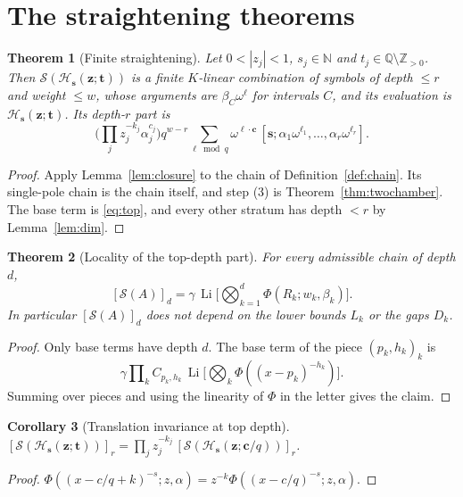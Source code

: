\documentclass[11pt]{amsart}
\newtheorem{theorem}{Theorem}[section]
\newtheorem{corollary}[theorem]{Corollary}
\theoremstyle{definition}
\theoremstyle{remark}
\numberwithin{equation}{section}
\newcommand{\N}{\mathbb{N}}
\newcommand{\Z}{\mathbb{Z}}
\newcommand{\Q}{\mathbb{Q}}
\newcommand{\Li}{\operatorname{Li}}
\newcommand{\cS}{\mathcal{S}}
\newcommand{\s}{\mathbf{s}}
\newcommand{\z}{\mathbf{z}}
\newcommand{\tb}{\mathbf{t}}
\newcommand{\cb}{\mathbf{c}}
\newcommand{\lb}{\boldsymbol{\ell}}
\newcommand{\Hs}{\mathcal{H}}
\begin{document}
\section{The straightening theorems}\label{sec:theorems}

\begin{theorem}[Finite straightening]\label{thm:main}
Let $0<|z_j|<1$, $s_j\in\N$ and $t_j\in\Q\setminus\Z_{>0}$. Then $\cS(\Hs_\s(\z;\tb))$ is a finite $K$-linear combination of symbols of depth $\le r$ and weight $\le w$, whose arguments are $\beta_C\omega^\ell$ for intervals $C$, and its evaluation is $\Hs_\s(\z;\tb)$. Its depth-$r$ part is
\begin{equation}\label{eq:top}
\Big(\prod_jz_j^{-k_j}\alpha_j^{c_j}\Big)q^{w-r}\sum_{\lb\bmod q}\omega^{\lb\cdot\cb}\,[\s;\alpha_1\omega^{\ell_1},\dots,\alpha_r\omega^{\ell_r}].
\end{equation}
\end{theorem}
\begin{proof}
Apply Lemma~\ref{lem:closure} to the chain of Definition~\ref{def:chain}. Its single-pole chain is the chain itself, and step (3) is Theorem~\ref{thm:twochamber}. The base term is \eqref{eq:top}, and every other stratum has depth $<r$ by Lemma~\ref{lem:dim}.
\end{proof}

\begin{theorem}[Locality of the top-depth part]\label{thm:locality}
For every admissible chain of depth $d$,
\[
[\cS(A)]_d=\gamma\,\Li\Big[\bigotimes_{k=1}^d\Phi(R_k;w_k,\beta_k)\Big].
\]
In particular $[\cS(A)]_d$ does not depend on the lower bounds $L_k$ or the gaps $D_k$.
\end{theorem}
\begin{proof}
Only base terms have depth $d$. The base term of the piece $(p_k,h_k)_k$ is\[\gamma\prod\nolimits_k C_{p_k,h_k}\,\Li\big[\textstyle\bigotimes_k\Phi((x-p_k)^{-h_k})\big].\] Summing over pieces and using the linearity of $\Phi$ in the letter gives the claim.
\end{proof}

\begin{corollary}[Translation invariance at top depth]\label{cor:transl}
$[\cS(\Hs_\s(\z;\tb))]_r=\prod_jz_j^{-k_j}\,[\cS(\Hs_\s(\z;\cb/q))]_r$.
\end{corollary}
\begin{proof}
$\Phi((x-c/q+k)^{-s};z,\alpha)=z^{-k}\Phi((x-c/q)^{-s};z,\alpha)$.
\end{proof}
\end{document}
